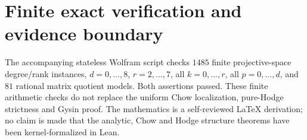 \documentclass[11pt]{article}
\begin{document}
\section{Finite exact verification and evidence boundary}
The accompanying stateless Wolfram script checks $1485$
finite projective-space degree/rank instances, $d=0,\ldots,8$,
$r=2,\ldots,7$, all $k=0,\ldots,r$, all $p=0,\ldots,d$,
and $81$ rational matrix quotient models. Both assertions
passed. These finite arithmetic checks do not replace the
uniform Chow localization, pure-Hodge strictness and Gysin proof.
The mathematics is a self-reviewed LaTeX derivation; no claim
is made that the analytic, Chow and Hodge structure theorems
have been kernel-formalized in Lean.
\end{document}
